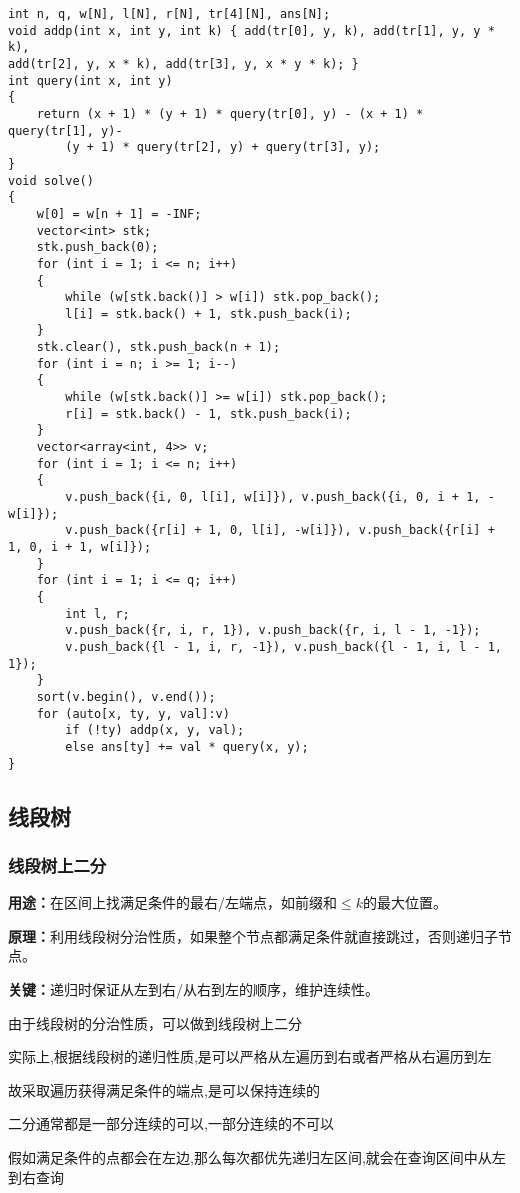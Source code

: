 \documentclass[a4paper, fontset=none]{ctexart}
\begin{document}
\begin{verbatim}
int n, q, w[N], l[N], r[N], tr[4][N], ans[N];
void addp(int x, int y, int k) { add(tr[0], y, k), add(tr[1], y, y * k),
add(tr[2], y, x * k), add(tr[3], y, x * y * k); }
int query(int x, int y)
{
    return (x + 1) * (y + 1) * query(tr[0], y) - (x + 1) * query(tr[1], y)-
        (y + 1) * query(tr[2], y) + query(tr[3], y);
}
void solve()
{
    w[0] = w[n + 1] = -INF;
    vector<int> stk;
    stk.push_back(0);
    for (int i = 1; i <= n; i++)
    {
        while (w[stk.back()] > w[i]) stk.pop_back();
        l[i] = stk.back() + 1, stk.push_back(i);
    }
    stk.clear(), stk.push_back(n + 1);
    for (int i = n; i >= 1; i--)
    {
        while (w[stk.back()] >= w[i]) stk.pop_back();
        r[i] = stk.back() - 1, stk.push_back(i);
    }
    vector<array<int, 4>> v;
    for (int i = 1; i <= n; i++)
    {
        v.push_back({i, 0, l[i], w[i]}), v.push_back({i, 0, i + 1, -w[i]});
        v.push_back({r[i] + 1, 0, l[i], -w[i]}), v.push_back({r[i] + 1, 0, i + 1, w[i]});
    }
    for (int i = 1; i <= q; i++)
    {
        int l, r;
        v.push_back({r, i, r, 1}), v.push_back({r, i, l - 1, -1});
        v.push_back({l - 1, i, r, -1}), v.push_back({l - 1, i, l - 1, 1});
    }
    sort(v.begin(), v.end());
    for (auto[x, ty, y, val]:v)
        if (!ty) addp(x, y, val);
        else ans[ty] += val * query(x, y);
}
\end{verbatim}
\subsection{线段树}
\subsubsection{线段树上二分}
\textbf{用途：}在区间上找满足条件的最右/左端点，如前缀和$\leq k$的最大位置。

\textbf{原理：}利用线段树分治性质，如果整个节点都满足条件就直接跳过，否则递归子节点。

\textbf{关键：}递归时保证从左到右/从右到左的顺序，维护连续性。

由于线段树的分治性质，可以做到线段树上二分

实际上,根据线段树的递归性质,是可以严格从左遍历到右或者严格从右遍历到左

故采取遍历获得满足条件的端点,是可以保持连续的

二分通常都是一部分连续的可以,一部分连续的不可以

假如满足条件的点都会在左边,那么每次都优先递归左区间,就会在查询区间中从左到右查询
\end{document}

